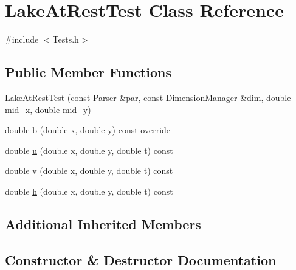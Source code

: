 \hypertarget{classLakeAtRestTest}{}\section{Lake\+At\+Rest\+Test Class Reference}
\label{classLakeAtRestTest}


{\ttfamily \#include $<$Tests.\+h$>$}

\subsection*{Public Member Functions}
\begin{DoxyCompactItemize}
\item 
\hyperlink{classLakeAtRestTest_a5a62aba2946df4d09f41bbeea8df2c0a}{Lake\+At\+Rest\+Test} (const \hyperlink{structParser}{Parser} \&par, const \hyperlink{structDimensionManager}{Dimension\+Manager} \&dim, double mid\+\_\+x, double mid\+\_\+y)
\item 
double \hyperlink{classLakeAtRestTest_a15491ec847ab6b11c9d15ac670ebf350}{b} (double x, double y) const override
\item 
double \hyperlink{classLakeAtRestTest_ae42b33d385d15e0af85b372c61cdf1ab}{u} (double x, double y, double t) const
\item 
double \hyperlink{classLakeAtRestTest_a28e6c95e19a7419e53a09e1b32082419}{v} (double x, double y, double t) const
\item 
double \hyperlink{classLakeAtRestTest_acba50afd11751c9557b639e84e895f41}{h} (double x, double y, double t) const
\end{DoxyCompactItemize}
\subsection*{Additional Inherited Members}


\subsection{Constructor \& Destructor Documentation}
\mbox{\label{classLakeAtRestTest_a5a62aba2946df4d09f41bbeea8df2c0a}} 
